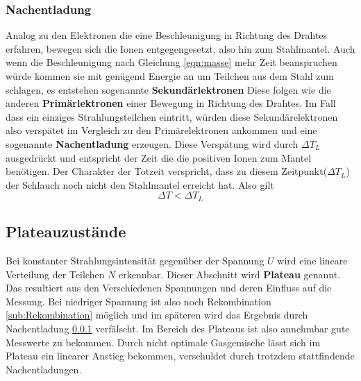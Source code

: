 \subsubsection{Nachentladung}
\label{sub:Nachentladung}
Analog zu den Elektronen die eine Beschleunigung in Richtung des Drahtes erfahren, bewegen sich die Ionen entgegengesetzt, also hin zum Stahlmantel.
Auch wenn die Beschleunigung nach Gleichung \eqref{eqn:masse} mehr Zeit beanspruchen würde kommen sie mit genügend Energie an um Teilchen aus dem Stahl zum schlagen, es entstehen sogenannte \textbf{Sekundärlektronen}
Diese folgen wie die anderen \textbf{Primärlektronen} einer Bewegung in Richtung des Drahtes. Im Fall dass ein einziges Strahlungsteilchen eintritt, würden diese Sekundärelektronen also verspätet im Vergleich zu den Primärelektronen ankommen
und eine sogenannte \textbf{Nachentladung} erzeugen. Diese Verspätung wird durch $\Delta T_L$ ausgedrückt und entspricht der Zeit die die positiven Ionen zum Mantel benötigen.
Der Charakter der Totzeit verspricht, dass zu diesem Zeitpunkt($\Delta T_L$) der Schlauch noch nicht den Stahlmantel erreicht hat. Also gilt
\begin{equation*}
\label{eqn:vergleich}
\Delta T < \Delta T_L
\end{equation*}

\subsection{Plateauzustände}
Bei konstanter Strahlungsintensität gegenüber der Spannung $U$ wird eine lineare Verteilung der Teilchen $N$ erkennbar. Dieser Abschnitt wird 
\textbf{Plateau} genannt. Das resultiert aus den Verschiedenen Spannungen und deren Einfluss auf die Messung. Bei niedriger Spannung ist also noch Rekombination \ref{sub:Rekombination} möglich und im späteren wird das Ergebnis durch Nachentladung \ref{sub:Nachentladung} verfälscht. 
Im Bereich des Plateaus ist also annehmbar gute Messwerte zu bekommen. Durch nicht optimale Gasgemische lässt sich im Plateau ein linearer Anstieg bekommen,
verschuldet durch trotzdem stattfindende Nachentladungen.


